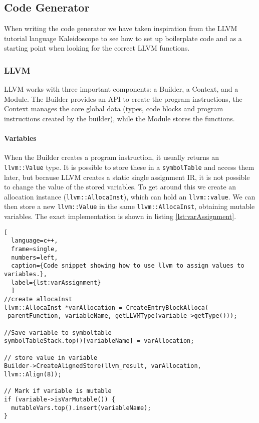 \subsection{Code Generator}
\label{sec:CodeGenImplement}
When writing the code generator we have taken inspiration from the LLVM tutorial
language Kaleidoscope\cite{LLVMTutorial} to see how to set up boilerplate code and as a
starting point when looking for the correct LLVM functions.

\subsubsection{LLVM}
LLVM works with three important components: a Builder, a Context, and a Module. The
Builder provides an API to create the program instructions, the Context manages the
core global data (types, code blocks and program instructions created by the
builder), while the Module stores the functions.

\paragraph*{Variables}
When the Builder creates a program instruction, it usually returns an \texttt{llvm::Value}
type. It is possible to store these in a \texttt{symbolTable} and access them later,
but because LLVM creates a static single assignment IR, it is not possible to change
the value of the stored variables. To get around this we create an allocation
instance (\texttt{llvm::AllocaInst}), which can hold an \texttt{llvm::value}. We can
then store a new
\texttt{llvm::Value} in the same \texttt{llvm::AllocaInst}, obtaining mutable variables. The exact
implementation is shown in listing \ref{lst:varAssignment}.

\begin{lstlisting}[
  language=c++,
  frame=single,
  numbers=left,
  caption={Code snippet showing how to use llvm to assign values to variables.},
  label={lst:varAssignment}
  ]
//create allocaInst
llvm::AllocaInst *varAllocation = CreateEntryBlockAlloca(
 parentFunction, variableName, getLLVMType(variable->getType()));
  	
//Save variable to symboltable
symbolTableStack.top()[variableName] = varAllocation;

// store value in variable
Builder->CreateAlignedStore(llvm_result, varAllocation, llvm::Align(8));

// Mark if variable is mutable
if (variable->isVarMutable()) {
  mutableVars.top().insert(variableName);
}
\end{lstlisting}

